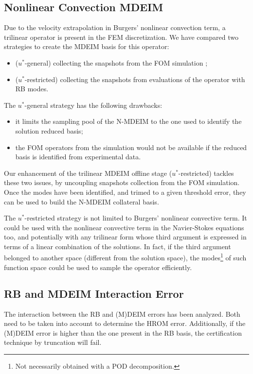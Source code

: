 \documentclass[thesis.tex]{subfiles}
\begin{document}
\subsection{Nonlinear Convection MDEIM}
Due to the velocity extrapolation in Burgers' nonlinear convection term,
a trilinear operator is present in the FEM discretization.
We have compared two strategies to create the MDEIM basis for this operator:
\begin{itemize}
    \item (\mbox{$u^{*}$-general}) collecting the snapshots from the FOM simulation \cite{Santo_Manzoni_2019};
    \item (\mbox{$u^{*}$-restricted}) collecting the snapshots from evaluations of the operator with RB modes.
\end{itemize}
The \mbox{$u^{*}$-general} strategy has the following drawbacks:
\begin{itemize}
    \item it limits the sampling pool of the \mbox{N-MDEIM} to 
    the one used to identify the solution reduced basis;
    \item the FOM operators from the simulation would not be available 
    if the reduced basis is identified from experimental data.
\end{itemize}
Our enhancement of the trilinear MDEIM offline stage (\mbox{$u^{*}$-restricted})
tackles these two issues, by uncoupling snapshots collection from the FOM simulation.
Once the modes have been identified, and trimed to a given threshold error,
they can be used to build the \mbox{N-MDEIM} collateral basis.

The \mbox{$u^{*}$-restricted} strategy is not limited to Burgers' nonlinear convective term.
It could be used with the nonlinear convective term in the Navier-Stokes equations too,
and potentially with any trilinear form whose third argument is expressed
in terms of a linear combination of the solutions.
In fact, if the third argument belonged to another space (different from the solution space),
the modes\footnote{Not necessarily obtained with a POD decomposition.} of such function space could be used to sample the operator efficiently.

\subsection{RB and MDEIM Interaction Error}
The interaction between the RB and (M)DEIM errors has been analyzed.
Both need to be taken into account to determine the HROM error.
Additionally, if the (M)DEIM error is higher than the one present in the RB basis,
the certification technique by truncation will fail.
\end{document}
